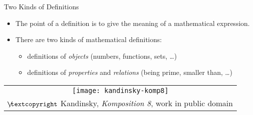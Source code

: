 \begin{frame}{Two Kinds of Definitions}


	\begin{itemize}

		\item The point of a definition is to give the meaning of a mathematical expression.
		
		\item There are two kinds of mathematical definitions:
		
			\begin{itemize}
			
				\item definitions of \emph{objects} (numbers, functions, sets, \dots)
				
				\item definitions of \emph{properties} and \emph{relations} (being prime, smaller than, \dots)
			
			\end{itemize}
			
	\end{itemize}
	
	\begin{center}
		\begin{tabular}{c}
		\texttt{[image: kandinsky-komp8]}\\[-1ex]
		{\tiny $\not\hspace{-1ex}\textcopyright$ Kandinsky, \emph{Komposition 8}, work in public domain}
		\end{tabular}
		\end{center}

\end{frame}

